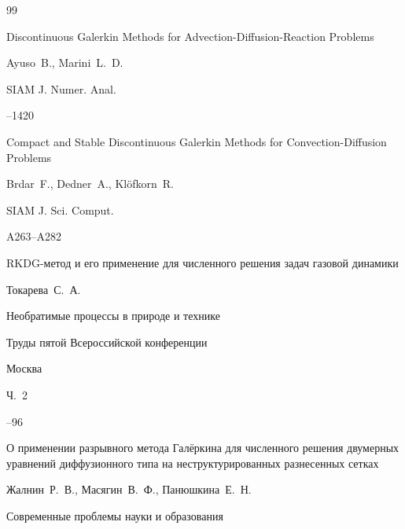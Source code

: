 \begin{thebibliography}{99}

\paper Discontinuous Galerkin Methods for Advection-Diffusion-Reaction Problems 

\by Ayuso~B., Marini~L.~D.

\jour SIAM J. Numer. Anal.




--1420





\paper  Compact and Stable Discontinuous Galerkin Methods for Convection-Diffusion Problems 

\by Brdar~F., Dedner~A., Kl\"ofkorn~R.

\jour SIAM J. Sci. Comput.




\pages A263--A282







\paper RKDG-метод и его применение для численного решения задач газовой динамики

\by Токарева~С.~А.

\inbook Необратимые процессы в природе и технике

\bookinfo Труды пятой Всероссийской конференции

\publaddr Москва


\volinfo Ч.~2

--96






\paper О применении разрывного метода Галёркина для численного решения двумерных уравнений диффузионного типа на неструктурированных разнесенных сетках

\by Жалнин~Р.~В., Масягин~В.~Ф., Панюшкина~Е.~Н.

\jour Современные проблемы науки и образования



\end{thebibliography}
